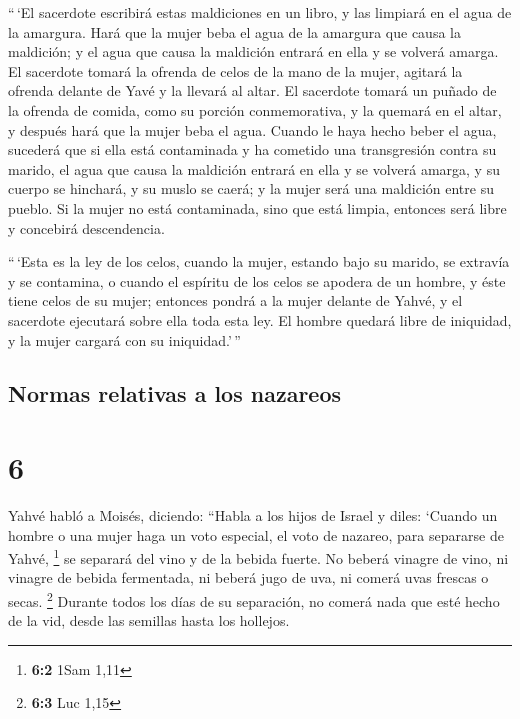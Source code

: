  ``\,`El sacerdote escribirá estas maldiciones en un
libro, y las limpiará en el agua de la amargura.  Hará
que la mujer beba el agua de la amargura que causa la maldición; y el
agua que causa la maldición entrará en ella y se volverá amarga.
 El sacerdote tomará la ofrenda de celos de la mano de la
mujer, agitará la ofrenda delante de Yavé y la llevará al altar.
 El sacerdote tomará un puñado de la ofrenda de comida,
como su porción conmemorativa, y la quemará en el altar, y después hará
que la mujer beba el agua.  Cuando le haya hecho beber el
agua, sucederá que si ella está contaminada y ha cometido una
transgresión contra su marido, el agua que causa la maldición entrará en
ella y se volverá amarga, y su cuerpo se hinchará, y su muslo se caerá;
y la mujer será una maldición entre su pueblo.  Si la
mujer no está contaminada, sino que está limpia, entonces será libre y
concebirá descendencia.

 ``\,`Esta es la ley de los celos, cuando la mujer,
estando bajo su marido, se extravía y se contamina,  o
cuando el espíritu de los celos se apodera de un hombre, y éste tiene
celos de su mujer; entonces pondrá a la mujer delante de Yahvé, y el
sacerdote ejecutará sobre ella toda esta ley.  El hombre
quedará libre de iniquidad, y la mujer cargará con su iniquidad.'\,''

\hypertarget{normas-relativas-a-los-nazareos}{%
\subsection{Normas relativas a los
nazareos}\label{normas-relativas-a-los-nazareos}}

\hypertarget{section-5}{%
\section{6}\label{section-5}}

 Yahvé habló a Moisés, diciendo:  ``Habla a
los hijos de Israel y diles: `Cuando un hombre o una mujer haga un voto
especial, el voto de nazareo, para separarse de Yahvé, \footnote{\textbf{6:2}
  1Sam 1,11}  se separará del vino y de la bebida fuerte.
No beberá vinagre de vino, ni vinagre de bebida fermentada, ni beberá
jugo de uva, ni comerá uvas frescas o secas. \footnote{\textbf{6:3} Luc
  1,15}  Durante todos los días de su separación, no
comerá nada que esté hecho de la vid, desde las semillas hasta los
hollejos.

